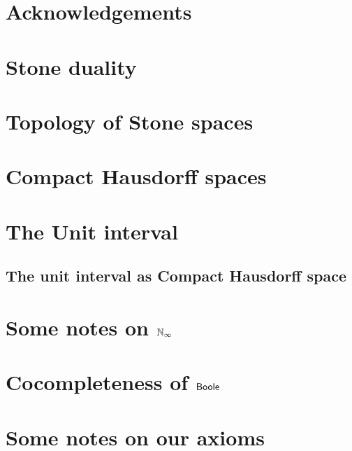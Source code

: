 \documentclass{../util/zariski}
\begin{document}
\section*{Acknowledgements}


\section{Stone duality}





\section{Topology of Stone spaces}





\section{Compact Hausdorff spaces}




\section{The Unit interval}
\subsection{The unit interval as Compact Hausdorff space}





\appendix
\section{Some notes on $\mathbb{N}_{\infty}$}


\section{Cocompleteness of $\mathsf{Boole}$}

\section{Some notes on our axioms}
\label{NotesOnAxioms}


\end{document}
